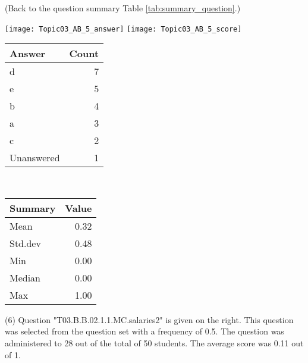 \documentclass[12pt,english,nohyper]{tufte-handout}\usepackage[]{graphicx}\usepackage[]{color}
\begin{document}
 (Back to the question summary Table \ref{tab:summary_question}.)

\begin{center} \texttt{[image: Topic03\_AB\_5\_answer]} \texttt{[image: Topic03\_AB\_5\_score]} \end{center} 

\begin{center}%
\begin{tabular}{lr}
  \hline
Answer & Count \\ 
  \hline
d &   7 \\ 
  e &   5 \\ 
  b &   4 \\ 
  a &   3 \\ 
  c &   2 \\ 
  Unanswered &   1 \\ 
   \hline
\end{tabular}
~~~~~~~~%
\begin{tabular}{lr}
  \hline
Summary & Value \\ 
  \hline
Mean & 0.32 \\ 
  Std.dev & 0.48 \\ 
  Min & 0.00 \\ 
  Median & 0.00 \\ 
  Max & 1.00 \\ 
   \hline
\end{tabular}
\end{center}\newpage{} (6) Question "T03.B.B.02.1.1.MC.salaries2" is given on the right. This question was selected from the question set with a frequency of 0.5. The question was administered to 28 out of the total of 50 students. The average score was 0.11 out of 1.
\end{document}

